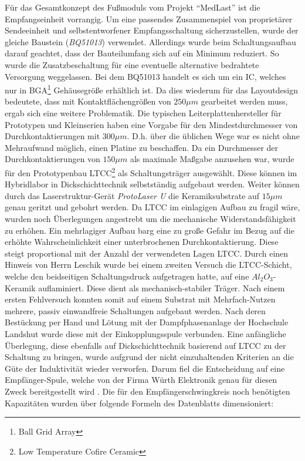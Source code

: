 \documentclass[12pt]{scrreprt} %
\begin{document}
Für das Gesamtkonzept des Fußmoduls vom Projekt "`MedLast"' ist die Empfangseinheit vorrangig. Um eine passendes Zusammenspiel von proprietärer Sendeeinheit und selbstentworfener Empfangsschaltung sicherzustellen, wurde der gleiche Baustein (\textit{BQ51013}) verwendet. Allerdings wurde beim Schaltungsaufbau darauf geachtet, dass der Bauteilumfang sich auf ein Minimum reduziert. So wurde die Zusatzbeschaltung für eine eventuelle alternative bedrahtete Versorgung weggelassen. Bei dem BQ51013 handelt es sich um ein IC, welches nur in BGA\footnote{Ball Grid Array} Gehäusegröße erhältlich ist. Da dies wiederum für das Layoutdesign bedeutete, dass mit Kontaktflächengrößen von $250\mu m$ gearbeitet werden muss, ergab sich eine weitere Problematik. Die typischen Leiterplattenhersteller für Prototypen und Kleinserien haben eine Vorgabe für den Mindestdurchmesser von Durchkontaktierungen mit $300\mu m$. D.h. über die üblichen Wege war es nicht ohne Mehraufwand möglich, einen Platine zu beschaffen. Da ein Durchmesser der Durchkontaktierungen von $150\mu m$ als maximale Maßgabe anzusehen war, wurde für den Prototypenbau LTCC\footnote{Low Temperature Cofire Ceramic} als Schaltungsträger ausgewählt. Diese können im Hybridlabor in Dickschichttechnik selbstständig aufgebaut werden. Weiter können durch das Laserstruktur-Gerät \textit{ProtoLaser U} die Keramiksubstrate auf $15\mu m$ genau geritzt und gebohrt werden.  Da LTCC im einlagigen Aufbau zu fragil wäre, wurden noch Überlegungen angestrebt um die mechanische Widerstandsfähigkeit zu erhöhen. Ein mehrlagiger Aufbau barg eine zu große Gefahr im Bezug auf die erhöhte Wahrscheinlichkeit einer unterbrochenen Durchkontaktierung. Diese steigt proportional mit der Anzahl der verwendeten Lagen LTCC. Durch einen Hinweis von Herrn Leschik wurde bei einem zweiten Versuch die LTCC-Schicht, welche den beidseitigen Schaltungsdruck aufgetragen hatte, auf eine $Al_2O_3$-Keramik auflaminiert. Diese dient als mechanisch-stabiler Träger. Nach einem ersten Fehlversuch konnten somit auf einem Substrat mit Mehrfach-Nutzen mehrere, passiv einwandfreie Schaltungen aufgebaut werden. Nach deren Bestückung per Hand und Lötung mit der Dampfphasenanlage der Hochschule Landshut wurde diese mit der Einkopplungsspule verbunden. Eine anfängliche Überlegung, diese ebenfalls auf Dickschichttechnik basierend auf LTCC zu der Schaltung zu bringen, wurde aufgrund der nicht einzuhaltenden Kriterien an die Güte der Induktivität wieder verworfen. Darum fiel die Entscheidung auf eine Empfänger-Spule, welche von der Firma Würth Elektronik genau für diesen Zweck bereitgestellt wird \citep{Spule}. Die für den Empfängerschwingkreis noch benötigten Kapazitäten wurden über folgende Formeln des Datenblatts \citep{BQ51013} dimensioniert:
\end{document}
